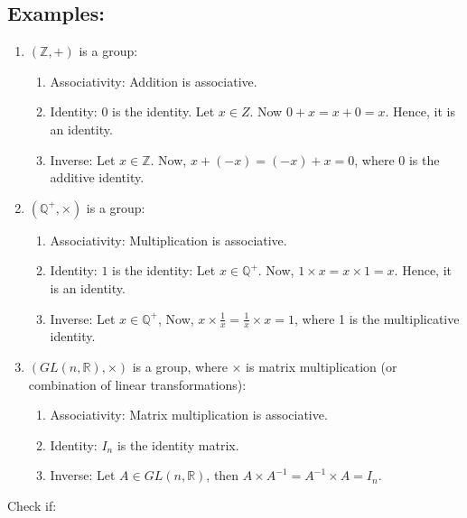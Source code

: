 \documentclass[12pt, oneside]{book}
\begin{document}
\subsection{Examples:}
\begin{enumerate}
	\item \( \left( \mathbb{Z}, +\right) \) is a group:
	      \begin{enumerate}
		      \item Associativity: Addition is associative.
		      \item Identity: \(0\) is the identity. Let \(x \in Z\). Now \(0 + x = x + 0 = x\). Hence, it is an identity.
		      \item Inverse: Let \(x \in \mathbb{Z}\). Now, \(x + (-x) = (-x) + x = 0\), where \(0\) is the additive identity.
	      \end{enumerate}
	\item \(\left( \mathbb{Q}^{+}, \times \right)\) is a group:
	      \begin{enumerate}
		      \item Associativity: Multiplication is associative.
		      \item Identity: \(1\) is the identity:
		            Let \(x \in \mathbb{Q}^{+} \). Now, \(1 \times x = x \times 1 = x\). Hence, it is an identity.
		      \item Inverse: Let \(x \in \mathbb{Q}^{+} \), Now, \(x \times \frac{1}{x} = \frac{1}{x} \times x = 1\), where 1 is the multiplicative identity.
	      \end{enumerate} \break
	\item \(\left(GL(n,\mathbb{R}), \times \right)\) is a group, where \(\times\) is matrix multiplication (or combination of linear transformations):
	      \begin{enumerate}
		      \item Associativity: Matrix multiplication is associative.
		      \item Identity: \(I_n\) is the identity matrix.
		      \item Inverse: Let \(A \in GL(n,\mathbb{R})\), then \(A \times A^{-1} = A^{-1} \times A = I_n\).
	      \end{enumerate}
\end{enumerate}
Check if:
\end{document}
